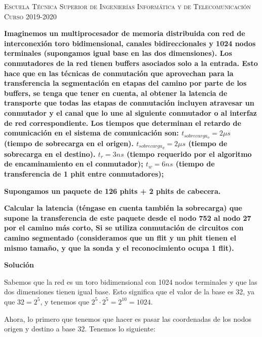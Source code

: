 \documentclass[11pt,a4paper]{article}
\begin{document}
\begin{titlepage}
\begin{minipage}{\textwidth}
\vspace{0.7cm}
\textsc{Escuela Técnica Superior de Ingenierías Informática y de Telecomunicación}\\
\vspace{1cm}
\textsc{Curso 2019-2020}
\end{minipage}
\end{titlepage}


\setlength{\parskip}{1em}

\noindent
\textbf{Imaginemos un multiprocesador de memoria distribuida con red de interconexión toro
bidimensional, canales bidireccionales y 1024 nodos terminales (supongamos igual base en las dos
dimensiones).
Los conmutadores de la red tienen buffers asociados solo a la entrada. Esto hace que en las
técnicas de conmutación que aprovechan para la transferencia la segmentación en etapas del camino
por parte de los buffers, se tenga que tener en cuenta, al obtener la latencia de transporte que
todas las etapas de conmutación incluyen atravesar un conmutador y el canal que lo une al
siguiente conmutador o al interfaz de red correspondiente. Los tiempos que determinan el retardo
de comunicación en el sistema de comunicación son: $t_{sobrecarga_o} = 2\mu s$ (tiempo de sobrecarga
en el origen). $t_{sobrecarga_d} = 2\mu s$ (tiempo de sobrecarga en el destino). $t_r = 3 ns$ (tiempo
requerido por el algoritmo de encaminamiento en el conmutador); $t_w = 6 ns$ (tiempo de
transferencia de 1 phit entre conmutadores);}

\noindent
\textbf{Supongamos un paquete de 126 phits + 2 phits de cabecera.}

\noindent
\textbf{Calcular la latencia (téngase en cuenta también la sobrecarga) que supone la transferencia de este paquete desde el nodo 752 al nodo 27 por el camino más corto, Si se utiliza conmutación de circuitos con camino segmentado (consideramos que un flit y un phit tienen el mismo tamaño, y que la sonda y el reconocimiento ocupa 1 flit).
}

\textbf{Solución}

Sabemos que la red es un toro bidimensional con 1024 nodos terminales y que las dos dimensiones
tienen igual base. Esto significa que el valor de la base es 32, ya que $32 = 2^5$, y tenemos
que $2^5 \cdot 2^5 = 2^{10} = 1024$.

Ahora, lo primero que tenemos que hacer es pasar las coordenadas de los nodos origen y destino
a base 32. Tenemos lo siguiente:
\end{document}
